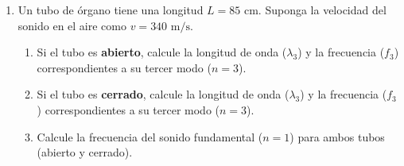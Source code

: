 \documentclass[11pt, letterpaper]{article}
\newif\ifshowanswers
\newcommand{\answer}[1]{%
	\ifshowanswers
	\par\vspace{0.15cm}
	\begin{tcolorbox}[colback=blue!5!white, colframe=blue!60!white, arc=1mm, boxrule=0.5pt, title=\textbf{\footnotesize SOLUCIÓN PASO A PASO (DOCENTE)}]
		\color{blue!80!black}\footnotesize #1
	\end{tcolorbox}
	\par\vspace{0.15cm}
	\else
	\par\vspace{0.3cm}
	\fi
}
\begin{document}
\begin{enumerate}[leftmargin=*, itemsep=0.8cm]
		\item  Un tubo de órgano tiene una longitud $L = 85\text{ cm}$. Suponga la velocidad del sonido en el aire como $v = 340\text{ m/s}$.
		\begin{enumerate}[label=\alph*), itemsep=0.2cm]
			\item Si el tubo es \textbf{abierto}, calcule la longitud de onda ($\lambda_3$) y la frecuencia ($f_3$) correspondientes a su tercer modo ($n = 3$).
			\item Si el tubo es \textbf{cerrado}, calcule la longitud de onda ($\lambda_3$) y la frecuencia ($f_3$) correspondientes a su tercer modo ($n = 3$).
			\item Calcule la frecuencia del sonido fundamental ($n = 1$) para ambos tubos (abierto y cerrado).
		\end{enumerate}
		\answer{
			\textbf{a) Tubo Abierto en el tercer modo ($n = 3$) con las ecuaciones (VIb) y (VIIb):}
			\[ \lambda_3 = \frac{2L}{n} = \frac{2 \cdot (0,85\text{ m})}{3} = \frac{1,70\text{ m}}{3} \approx \mathbf{0,567\text{ m}} \qquad ; \qquad f_3 = \frac{n \cdot v}{2L} = \frac{3 \cdot (340\text{ m/s})}{2 \cdot (0,85\text{ m})} = \frac{1020}{1,70} = \mathbf{600,0\text{ Hz}} \]
			\textbf{b) Tubo Cerrado en el tercer modo ($n = 3$) con las ecuaciones (VIa) y (VIIa):}
			\[ \lambda_3 = \frac{4L}{2n - 1} = \frac{4 \cdot (0,85\text{ m})}{2(3) - 1} = \frac{3,40\text{ m}}{5} = \mathbf{0,68\text{ m}} \qquad ; \qquad f_3 = \frac{v \cdot (2n - 1)}{4L} = \frac{(340\text{ m/s}) \cdot (2(3) - 1)}{4 \cdot (0,85\text{ m})} = \frac{340 \cdot 5}{3,40} = \mathbf{500,0\text{ Hz}} \]
			\textbf{c) Sonido fundamental ($n = 1$) en ambos tubos:}
			\[ f_{1\text{ (abierto)}} = \frac{1 \cdot (340\text{ m/s})}{2 \cdot (0,85\text{ m})} = \mathbf{200,0\text{ Hz}} \qquad ; \qquad f_{1\text{ (cerrado)}} = \frac{(340\text{ m/s}) \cdot (2(1) - 1)}{4 \cdot (0,85\text{ m})} = \mathbf{100,0\text{ Hz}} \]
			Para una misma longitud $L$, la frecuencia fundamental de un tubo abierto es el doble de la de un tubo cerrado.
		}
		

\end{enumerate}
\end{document}
